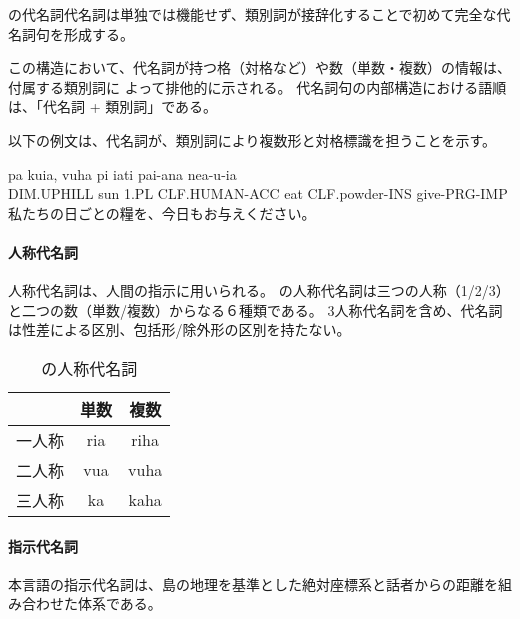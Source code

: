 \langname の代名詞代名詞は単独では機能せず、類別詞が接辞化することで初めて完全な代名詞句を形成する。

この構造において、代名詞が持つ格（対格など）や数（単数・複数）の情報は、付属する類別詞に
よって排他的に示される。
代名詞句の内部構造における語順は、「代名詞 + 類別詞」である。

以下の例文は、代名詞が、類別詞により複数形と対格標識を担うことを示す。

\begin{exe}
    \ex \gll pa kuia, vuha pi iati pai-ana nea-u-ia \\
        DIM.UPHILL sun 1.PL CLF.HUMAN-ACC eat CLF.powder-INS give-PRG-IMP \\
        \glt 私たちの日ごとの糧を、今日もお与えください。
\end{exe}

\paragraph{人称代名詞}
人称代名詞は、人間の指示に用いられる。
\langname の人称代名詞は三つの人称（1/2/3）と二つの数（単数/複数）からなる６種類である。
3人称代名詞を含め、代名詞は性差による区別、包括形/除外形の区別を持たない。

\begin{table}[H]
    \centering
    \begin{tabular}{lcc}
        \toprule
        & 単数 & 複数  \\
        \midrule
        一人称 & ria & riha \\
        二人称 & vua & vuha \\
        三人称 & ka & kaha \\
        \bottomrule
    \end{tabular}
    \caption{\centering \langname の人称代名詞}
    \label{tab:pronouns}
\end{table}

\paragraph{指示代名詞}
本言語の指示代名詞は、島の地理を基準とした絶対座標系と話者からの距離を組み合わせた体系である。

